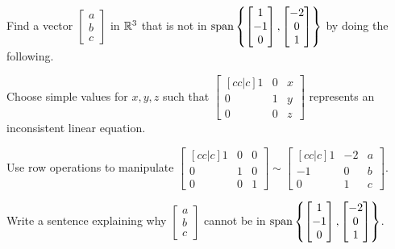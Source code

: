 \begin{applicationActivities}{4}{10}
\begin{activity}{15}
  Find a vector \(\begin{bmatrix}a\\b\\c\end{bmatrix}\)
  in \(\mathbb{R}^3\) that is not in
  \(\operatorname{span}\left\{\begin{bmatrix}1\\-1\\0\end{bmatrix},
  \begin{bmatrix}-2\\0\\1\end{bmatrix}\right\}\) by doing the following.
    \begin{subactivity}
      Choose simple values for \(x,y,z\) such that
      \(\begin{bmatrix}[cc|c]1&0&x\\0&1&y\\0&0&z\end{bmatrix}\)
      represents an inconsistent linear equation.
    \end{subactivity}
    \begin{subactivity}
      Use row operations to manipulate
      \(\begin{bmatrix}[cc|c]1&0&0\\0&1&0\\0&0&1\end{bmatrix}\sim
      \begin{bmatrix}[cc|c]1&-2&a\\-1&0&b\\0&1&c\end{bmatrix}\).
    \end{subactivity}
    \begin{subactivity}
      Write a sentence explaining why \(\begin{bmatrix}a\\b\\c\end{bmatrix}\)
      cannot be in \(\operatorname{span}\left\{\begin{bmatrix}1\\-1\\0\end{bmatrix},
      \begin{bmatrix}-2\\0\\1\end{bmatrix}\right\}\).
    \end{subactivity}
\end{activity}


\end{applicationActivities}

